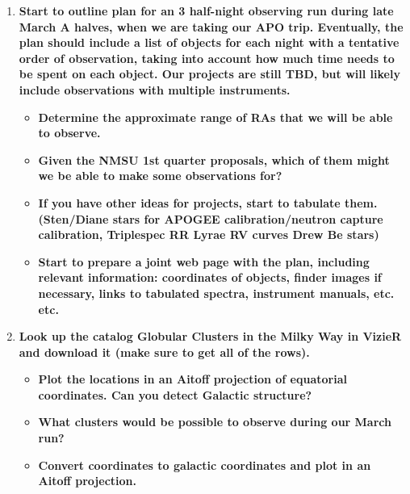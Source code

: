 \documentclass[12pt]{article}
\begin{document}
\begin{enumerate}[1.]
    \item \textbf{Start to outline plan for an 3 half-night observing
    run during late March A halves, when we are taking our APO trip.
    Eventually, the plan should include a list of objects for each
    night with a tentative order of observation, taking into account
    how much time needs to be spent on each object. Our projects are
    still TBD, but will likely include observations with multiple
    instruments.}
        \begin{itemize}
            \item \textbf{Determine the approximate range of RAs that
            we will be able to observe.}
            \item \textbf{Given the NMSU 1st quarter proposals, which
            of them might we be able to make some observations for?}
            \item \textbf{If you have other ideas for projects, start
            to tabulate them. (Sten/Diane stars for APOGEE
            calibration/neutron capture calibration, Triplespec RR
            Lyrae RV curves Drew Be stars)}
            \item \textbf{Start to prepare a joint web page with the
            plan, including relevant information: coordinates of
            objects, finder images if necessary, links to tabulated
            spectra, instrument manuals, etc. etc. }
        \end{itemize}

    \item \textbf{Look up the catalog Globular Clusters in the Milky
    Way in VizieR and download it (make sure to get all of the rows).}
        \begin{itemize}
            \item \textbf{Plot the locations in an Aitoff projection
            of equatorial coordinates. Can you detect Galactic
            structure?}
            \item \textbf{What clusters would be possible to observe
            during our March run? }
            \item \textbf{Convert coordinates to galactic coordinates
            and plot in an Aitoff projection.}
        \end{itemize}


\end{enumerate}
\end{document}
